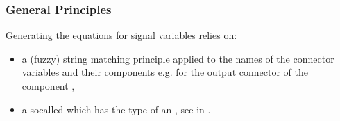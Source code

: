 \documentclass[letterpaper,10pt, openany,english]{sphinxmanual}
\begin{document}
\subsubsection{General Principles}
\label{\detokenize{requirements:general-principles}}
Generating the  equations for signal variables relies on:
\begin{itemize}
\item {} 
a (fuzzy) string matching principle applied to the names of the connector variables and their components e.g.  for the output connector  of the component ,

\item {} 
a so\sphinxhyphen{}called  which has the type of an , see  in .

\end{itemize}
\end{document}
